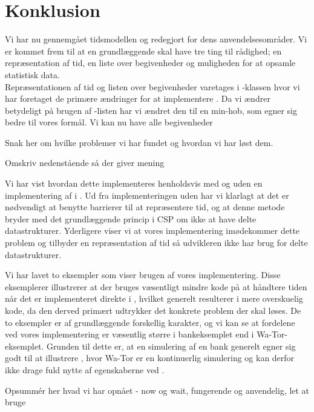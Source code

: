 \section{Konklusion}
Vi har nu gennemgået tidsmodellen \des og redegjort for dens anvendelsesområder. Vi er kommet frem til at en \des grundlæggende skal have tre ting til rådighed; en repræsentation af tid, en liste over begivenheder og muligheden for at opsamle statistisk data. \\
Repræsentationen af tid og listen over begivenheder varetages i -klassen hvor vi har foretaget de primære ændringer for at implementere \des. Da vi ændrer betydeligt på brugen af -listen har vi ændret den til en min-hob, som egner sig bedre til vores formål. Vi kan nu have alle begivenheder

Snak her om hvilke problemer vi har fundet og hvordan vi har løst dem. 

Omskriv nedenstående så der giver mening
\begin{shaded}
Vi har vist hvordan dette implementeres henholdsvis med og uden en implementering af \des i \pycsp. Ud fra implementeringen uden \des har vi klarlagt at det er nødvendigt at benytte barrierer til at repræsentere tid, og at denne metode bryder med det grundlæggende princip i CSP om ikke at have delte datastrukturer. Yderligere viser vi at vores implementering imødekommer dette problem og tilbyder en repræsentation af tid så udvikleren ikke har brug for delte datastrukturer. 

Vi har lavet to eksempler som viser brugen af vores \des implementering. Disse eksemplerer illustrerer at der bruges væsentligt mindre kode på at håndtere tiden når det er implementeret direkte i \pycsp, hvilket generelt resulterer i mere overskuelig kode, da den derved primært udtrykker det konkrete problem der skal løses. De to eksempler er af grundlæggende forskellig karakter, og vi kan se at fordelene ved vores \des implementering er væsentlig større i bankeksemplet end i Wa-Tor-eksemplet. Grunden til dette er, at en simulering af en bank generelt egner sig godt til at illustrere \des, hvor Wa-Tor er en kontinuerlig simulering og kan derfor ikke drage fuld nytte af egenskaberne ved \des. 
\end{shaded}

Opsummér her hvad vi har opnået - now og wait, fungerende og anvendelig, let at bruge
